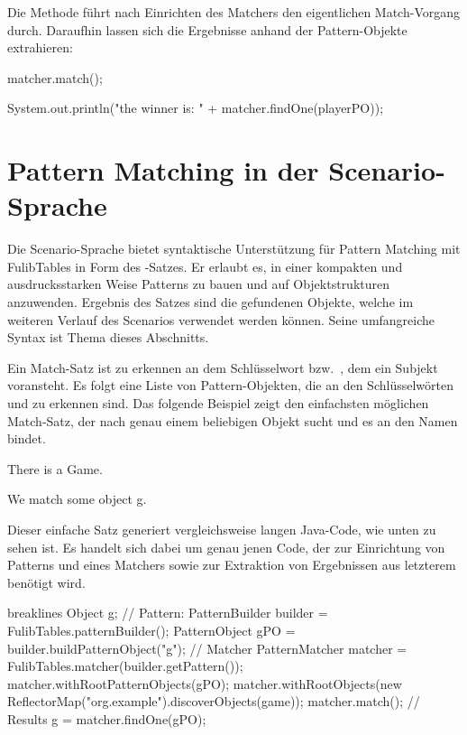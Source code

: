 Die Methode  führt nach Einrichten des Matchers den eigentlichen Match-Vorgang durch.
Daraufhin lassen sich die Ergebnisse anhand der Pattern-Objekte extrahieren:

\begin{jcodeblock}
    matcher.match();

    System.out.println("the winner is: " + matcher.findOne(playerPO));
\end{jcodeblock}


\section{Pattern Matching in der Scenario-Sprache}\label{sec:scenario-pattern-matching}

Die Scenario-Sprache bietet syntaktische Unterstützung für Pattern Matching mit FulibTables in Form des -Satzes.
Er erlaubt es, in einer kompakten und ausdrucksstarken Weise Patterns zu bauen und auf Objektstrukturen anzuwenden.
Ergebnis des Satzes sind die gefundenen Objekte, welche im weiteren Verlauf des Scenarios verwendet werden können.
Seine umfangreiche Syntax ist Thema dieses Abschnitts.

Ein Match-Satz ist zu erkennen an dem Schlüsselwort  bzw.\ , dem ein Subjekt voransteht.
Es folgt eine Liste von Pattern-Objekten, die an den Schlüsselwörten  und  zu erkennen sind.
Das folgende Beispiel zeigt den einfachsten möglichen Match-Satz, der nach genau einem beliebigen Objekt sucht und es an den Namen  bindet.

\begin{mdcodeblock}
    There is a Game.

    We match some object g.
\end{mdcodeblock}

Dieser einfache Satz generiert vergleichsweise langen Java-Code, wie unten zu sehen ist.
Es handelt sich dabei um genau jenen Code, der zur Einrichtung von Patterns und eines Matchers sowie zur Extraktion von Ergebnissen aus letzterem benötigt wird.

\begin{jcodeblock*}{breaklines}
    Object g;
    {
        // Pattern:
        PatternBuilder builder = FulibTables.patternBuilder();
        PatternObject gPO = builder.buildPatternObject("g");
        // Matcher
        PatternMatcher matcher = FulibTables.matcher(builder.getPattern());
        matcher.withRootPatternObjects(gPO);
        matcher.withRootObjects(new ReflectorMap("org.example").discoverObjects(game));
        matcher.match();
        // Results
        g = matcher.findOne(gPO);
    }
\end{jcodeblock*}

